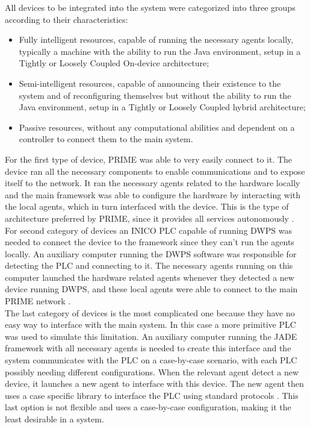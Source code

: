 All devices to be integrated into the system were categorized into three groups according to their characteristics:
\begin{itemize}
	\item Fully intelligent resources, capable of running the necessary agents locally, typically a machine with the ability to run the Java environment, setup in a Tightly or Loosely Coupled On-device architecture;
	\item Semi-intelligent resources, capable of announcing their existence to the system and of reconfiguring themselves but without the ability to run the Java environment, setup in a Tightly or Loosely Coupled hybrid architecture;
	\item Passive resources, without any computational abilities and dependent on a controller to connect them to the main system. 
\end{itemize}

For the first type of device, PRIME was able to very easily connect to it. The device ran all the necessary components to enable communications and to expose itself to the network. It ran the necessary agents related to the hardware locally and the main framework was able to configure the hardware by interacting with the local agents, which in turn interfaced with the device. This is the type of architecture preferred by PRIME, since it provides all services autonomously \cite{PRIME_plug_and_produce}.\\

For second category of devices an INICO \acrshort{PLC} capable of running \acrshort{DWPS} was needed to connect the device to the framework since they can't run the agents locally. An auxiliary computer running the \acrshort{DWPS} software was responsible for detecting the \acrshort{PLC} and connecting to it. The necessary agents running on this computer launched the hardware related agents whenever they detected a new device running \acrshort{DWPS}, and these local agents were able to connect to the main PRIME network \cite{PRIME_plug_and_produce}.\\

The last category of devices is the most complicated one because they have no easy way to interface with the main system. In this case a more primitive \acrshort{PLC} was used to simulate this limitation. An auxiliary computer running the \acrshort{JADE} framework with all necessary agents is needed to create this interface and the system communicates with the \acrshort{PLC} on a case-by-case scenario, with each \acrshort{PLC} possibly needing different configurations. When the relevant agent detect a new device, it launches a new agent to interface with this device. The new agent then uses a case specific library to interface the \acrshort{PLC} using standard protocols \cite{PRIME_plug_and_produce}. This last option is not flexible and uses a case-by-case configuration, making it the least desirable in a system.
